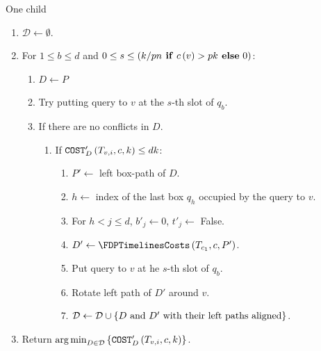 \begin{frame}{One child}
    \begin{enumerate}
        \item $\mathcal{D}\gets\emptyset$.
        \item For $1\leq b\leq d$ and $0\leq s\leq \left( k/pn \text{\textbf{ if} }c\left( v \right)>pk \text{\textbf{ else} 0} \right)$:
        \begin{enumerate}
            \item $D\gets P$
            \item Try putting query to $v$ at the $s$-th slot of $q_b$.
            \item If there are no conflicts in $D$.
            \begin{enumerate}
                \item If $\texttt{COST}'_{D}\left( T_{v,i},c,k \right)\leq dk$:
                \begin{enumerate}
                    \item $P'\gets$ left box-path of $D$.

                    \item $h\gets$ index of the last box $q_h$ occupied by the query to $v$.

                    \item For $h < j\leq d$, $b'_j\gets 0$, $t'_j\gets $ False.
                    \item $D'\gets \FDPTimelinesCosts\br{T_{c_1},c, P'}$.

                    \item Put query to $v$ at he $s$-th slot of $q_b$.

                    \item Rotate left path of $D'$ around $v$.

                    \item $\mathcal{D}\gets \mathcal{D} \cup \left\{ D \text{ and } D' \text{ with their left paths aligned} \right\}$.
                \end{enumerate}
            \end{enumerate}
        \end{enumerate}
        \item Return $\operatorname*{arg\,min}_{D\in \mathcal{D}}\left\{ \texttt{COST}'_D\left( T_{v,i},c, k \right) \right\}$.
    \end{enumerate}
\end{frame}
